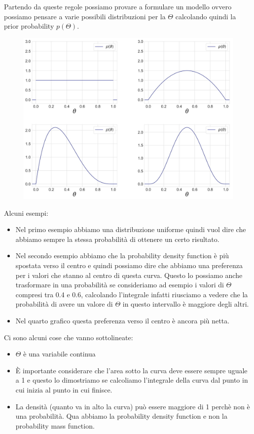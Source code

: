 \documentclass[14pt]{extreport}
\begin{document}
Partendo da queste regole possiamo provare a formulare un modello ovvero possiamo pensare a varie possibili distribuzioni per la $	\Theta$ calcolando
quindi la prior probability $p(\Theta)$.


\begin{figure}[H]
\centering
\includegraphics[width=0.7\linewidth]{29.jpeg}
\end{figure}

Alcuni esempi:
\begin{itemize}
\item Nel primo esempio abbiamo una distribuzione uniforme quindi vuol dire che abbiamo sempre la stessa probabilità di ottenere un certo risultato.
\item Nel secondo esempio abbiamo che la probability density function è più spostata verso il centro e quindi possiamo dire che abbiamo una preferenza
per i valori che stanno al centro di questa curva. Questo lo possiamo anche trasformare in una probabilità se consideriamo ad esempio i valori di
$\Theta$ compresi tra 0.4 e 0.6, calcolando l'integrale infatti riusciamo a vedere che la probabilità di avere un valore di $\Theta$ in questo
intervallo è maggiore degli altri.
\item Nel quarto grafico questa preferenza verso il centro è ancora più netta.
\end{itemize}

Ci sono alcuni cose che vanno sottolineate:
\begin{itemize}
\item $\Theta$ è una variabile continua
\item È importante considerare che l'area sotto la curva deve essere sempre uguale a 1 e questo lo dimostriamo se calcoliamo l'integrale della curva
dal punto in cui inizia al punto in cui finisce.
\item La densità (quanto va in alto la curva) può essere maggiore di 1 perchè non è una probabilità. Qua abbiamo la probability density function e non
la probability mass function.
\end{itemize}
\end{document}

